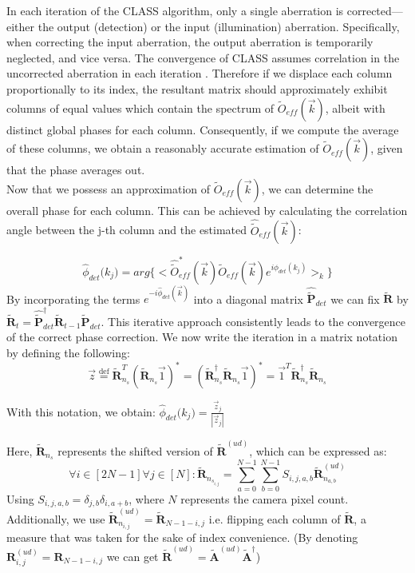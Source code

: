 \documentclass[pdflatex,sn-mathphys-num,Numbered]{sn-jnl}%
\theoremstyle{thmstyleone}%
\theoremstyle{thmstyletwo}%
\theoremstyle{thmstylethree}%
\begin{document}
In each iteration of the CLASS algorithm, only a single aberration is corrected—either the output (detection) or the input (illumination) aberration. Specifically, when correcting the input aberration, the output aberration is temporarily neglected, and vice versa. The convergence of CLASS assumes correlation in the uncorrected aberration in each iteration \cite{kang17}. Therefore if we displace each column proportionally to its index, the resultant matrix should approximately exhibit columns of equal values which contain the spectrum of $\tilde{O}_{eff}(\vec{k})$, albeit with distinct global phases for each column. Consequently, if we compute the average of these columns, we obtain a reasonably accurate estimation of $\tilde{O}_{eff}(\vec{k})$, given that the phase averages out.\\
Now that we possess an approximation of $\tilde{O}_{eff}(\vec{k})$, we can determine the overall phase for each column. This can be achieved by calculating the correlation angle between the j-th column and the estimated $\hat{\tilde{O}}_{eff}(\vec{k})$:

\begin{equation}
\hat{\phi}_{det}({k_{j})} = arg\{<\hat{\tilde{O}}_{eff}^*(\vec{k})\tilde{O}_{eff}(\vec{k})e^{i\phi_{det}(k_{j})}>_k\}
\tag{S6}
\label{eq:6}
\end{equation}
By incorporating the terms $e^{-i\hat{\phi}_{det}(\vec{k})}$ into a diagonal matrix $\hat{\tilde{\textbf{P}}}_{det}$ we can fix $\tilde{\textbf{R}}$ by $\tilde{\textbf{R}}_t=\hat{\tilde{\textbf{P}}}_{det}^{\dagger}\tilde{\textbf{R}}_{t-1}\hat{\tilde{\textbf{P}}}_{det}$. This iterative approach consistently leads to the convergence of the correct phase correction.
We now write the iteration in a matrix notation by defining the following:
\begin{equation}
\vec{z}\stackrel{\text{def}} =  \tilde{\textbf{R}}^{T}_{n_s}(\tilde{\textbf{R}}_{n_s}\vec{1})^*=(\tilde{\textbf{R}}^{\dagger}_{n_s}\tilde{\textbf{R}}_{n_s}\vec{1})^*=\vec{1}^T\tilde{\textbf{R}}^{\dagger}_{n_s}\tilde{\textbf{R}}_{n_s}
\tag{S7}
\label{eq:7}
\end{equation}

With this notation, we obtain:  $\hat{\phi}_{det}({k_{j})}=\frac{\vec{z}_j}{|\vec{z}_j|}$

Here, $\tilde{\textbf{R}}_{n_s}$ represents the shifted version of $\tilde{\textbf{R}}^{(ud)}$, which can be expressed as:
\begin{equation}
\forall i\in[2N-1] \forall j\in[N]:
\tilde{\textbf{R}}_{n_{s_{i,j}}}=\sum^{N-1}_{a=0}\sum^{N-1}_{b=0}S_{i,j,a,b}\tilde{\textbf{R}}^{(ud)}_{n_{a,b}}
\tag{S8}
\label{eq:8}
\end{equation}
Using $S_{i,j,a,b} = \delta_{j,b}\delta_{i,a+b}$, where $N$ represents the camera pixel count. Additionally, we use $\tilde{\textbf{R}}^{(ud)}_{n_{i,j}} = \tilde{\textbf{R}}_{N-1-i,j}$ i.e. flipping each column of $\tilde{\textbf{R}}$, a measure that was taken for the sake of index convenience.
(By denoting $\textbf{R}^{(ud)}_{{i,j}} = \textbf{R}_{N-1-i,j}$ we can get $\tilde{\textbf{R}}^{(ud)} = \tilde{\textbf{A}}^{(ud)}\tilde{\textbf{A}}^\dagger$)
% 
\end{document}

